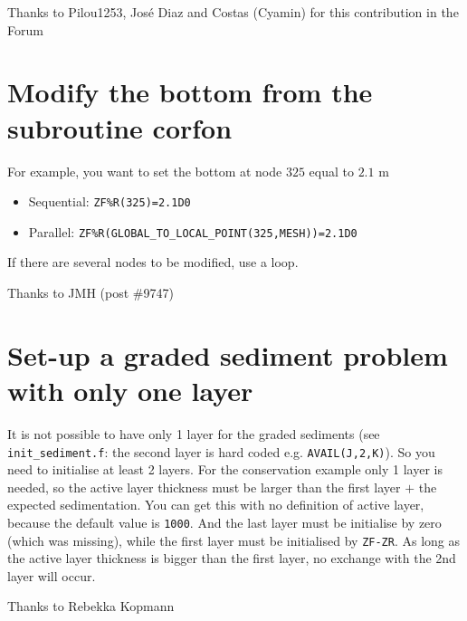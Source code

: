 
{\footnotesize Thanks to Pilou1253, Jos\'e Diaz and Costas (Cyamin) for this contribution in the Forum}

\section{Modify the bottom from the subroutine corfon}
For example, you want to set the bottom at node $325$ equal to $2.1$ m
\begin{itemize}
\item Sequential: \texttt{ZF\%R(325)=2.1D0}
\item Parallel: \texttt{ZF\%R(GLOBAL\_TO\_LOCAL\_POINT(325,MESH))=2.1D0}
\end{itemize}

If there are several nodes to be modified, use a loop.

{\footnotesize Thanks to JMH (post \#9747)}

\section{Set-up a graded sediment problem with only one layer}
It is not possible to have only 1 layer for the graded sediments (see \texttt{init\_sediment.f}: the second layer is hard coded e.g. \texttt{AVAIL(J,2,K)}). So you need to initialise at least 2 layers. For the conservation example only 1 layer is needed, so the active layer thickness must be larger than the first layer $+$ the expected sedimentation. You can get this with no definition of active layer, because the default value is \texttt{1000}. And the last layer must be initialise by zero (which was missing), while the first layer must be initialised by \texttt{ZF-ZR}. As long as the active layer thickness is bigger than the first layer, no exchange with the 2nd layer will occur.

{\footnotesize Thanks to Rebekka Kopmann}

